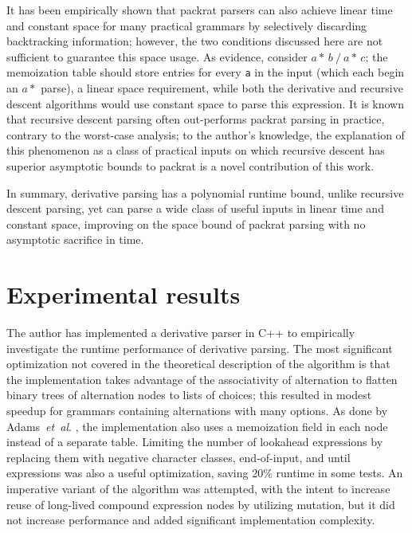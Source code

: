 \documentclass[submission,copyright,creativecommons]{eptcs}
\newcommand{\etal}{\textit{et~al}. }
\begin{document}
It has been empirically shown \cite{Kur15,MMY10} that packrat parsers can also achieve linear time and constant space for many practical grammars by selectively discarding backtracking information; however, the two conditions discussed here are not sufficient to guarantee this space usage. 
As evidence, consider ${a*}\,b\:/\:{a*}\,c$; the memoization table should store entries for every \texttt{a} in the input (which each begin an $a*$ parse), a linear space requirement, while both the derivative and recursive descent algorithms would use constant space to parse this expression.
It is known \cite{BS08,Kur15,MI08} that recursive descent parsing often out-performs packrat parsing in practice, contrary to the worst-case analysis; to the author's knowledge, the explanation of this phenomenon as a class of practical inputs on which recursive descent has superior asymptotic bounds to packrat is a novel contribution of this work.

In summary, derivative parsing has a polynomial runtime bound, unlike recursive descent parsing, yet can parse a wide class of useful inputs in linear time and constant space, improving on the space bound of packrat parsing with no asymptotic sacrifice in time.

\section{Experimental results}
\label{experimental-sec}

The author has implemented a derivative parser in C++ to empirically investigate the runtime performance of derivative parsing. 
The most significant optimization not covered in the theoretical description of the algorithm is that the implementation takes advantage of the associativity of alternation to flatten binary trees of alternation nodes to lists of choices; this resulted in modest speedup for grammars containing alternations with many options. 
As done by Adams~\etal \cite{AHM16}, the implementation also uses a memoization field in each node instead of a separate table.
Limiting the number of lookahead expressions by replacing them with negative character classes, end-of-input, and until expressions was also a useful optimization, saving 20\% runtime in some tests.
An imperative variant of the algorithm was attempted, with the intent to increase reuse of long-lived compound expression nodes by utilizing mutation, but it did not increase performance and added significant implementation complexity. 
\end{document}
